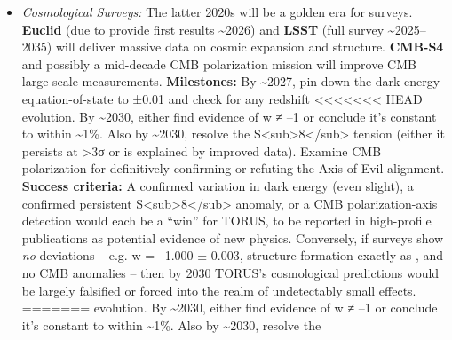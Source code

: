 \documentclass[]{article}
\begin{document}
{\begin{itemize}
\begin{itemize}
    detect a reproducible anomaly or constrain the TORUS quantum
    corrections to below 10\^{}-7 (for coherence) and below 10\^{}-5
    (fractional vacuum energy modification). \textbf{Decision point:}
    Around the end of this period, a review should assess if continuing
    to pursue these quantum experiments is worthwhile: if all results
    are null with tightening errors, TORUS's proposed quantum effects
    might be considered falsified; if any experiment shows an
    unexplained result, resources should be directed to thoroughly
    investigate and attempt independent confirmation.
  \item
    \emph{Cosmological Surveys:} The latter 2020s will be a golden era
    for surveys. \textbf{Euclid} (due to provide first results
    \textasciitilde{}2026) and \textbf{LSST} (full survey
    \textasciitilde{}2025--2035) will deliver massive data on cosmic
    expansion and structure. \textbf{CMB-S4} and possibly a mid-decade
    CMB polarization mission will improve CMB large-scale measurements.
    \textbf{Milestones:} By \textasciitilde{}2027, pin down the dark
    energy equation-of-state to ±0.01 and check for any redshift
<<<<<<< HEAD
    evolution. By \textasciitilde2030, either find evidence of w ≠ --1
    or conclude it's constant to within \textasciitilde1\%\hspace{0pt}.
    Also by \textasciitilde2030, resolve the
    S\textless sub\textgreater8\textless/sub\textgreater{} tension
    (either it persists at \textgreater3σ or is explained by improved
    data)\hspace{0pt}. Examine CMB polarization for definitively
    confirming or refuting the Axis of Evil alignment\hspace{0pt}.
    \textbf{Success criteria:} A confirmed variation in dark energy
    (even slight), a confirmed persistent
    S\textless sub\textgreater8\textless/sub\textgreater{} anomaly, or a
    CMB polarization-axis detection would each be a ``win'' for TORUS,
    to be reported in high-profile publications as potential evidence of
    new physics. Conversely, if surveys show \emph{no} deviations --
    e.g. w = --1.000 ± 0.003, structure formation exactly as \LambdaCDM, and
    no CMB anomalies -- then by 2030 TORUS's cosmological predictions
    would be largely falsified or forced into the realm of undetectably
    small effects.
=======
    evolution. By \textasciitilde{}2030, either find evidence of w ≠ --1
    or conclude it's constant to within \textasciitilde{}1\%​. Also by
    \textasciitilde{}2030, resolve the

\end{itemize}
\end{itemize}}
\end{document}
